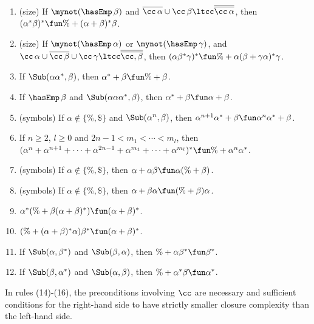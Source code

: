 \begin{enumerate}[\quad(1)]
\item (size) If $\mynot(\hasEmp\,\beta)$ and $\overline{\cc\,\alpha} \cup
  \cc\,\beta \ltcc \overline{\overline{\cc\,\alpha}}$, then
  $(\alpha^*\beta)^* \fun \% + (\alpha+\beta)^*\beta$.

\item (size) If $\mynot(\hasEmp\,\alpha)$ or $\mynot(\hasEmp\,\gamma)$, and
  $\cc\,\alpha \cup \overline{\cc\,\beta} \cup \cc\,\gamma \ltcc
  \overline{\overline{\cc,\beta}}$, then $(\alpha\beta^*\gamma)^*
  \fun \% + \alpha(\beta + \gamma\alpha)^*\gamma$.

\item If $\Sub(\alpha\alpha^*,\beta)$, then $\alpha^*+\beta \fun \% +
  \beta$.

\item If $\hasEmp\,\beta$ and $\Sub(\alpha\alpha\alpha^*, \beta)$,
  then $\alpha^* + \beta \fun \alpha + \beta$.

\item (symbols) If $\alpha\not\in\{\%,\$\}$ and $\Sub(\alpha^n, \beta)$, then
  $\alpha^{n+1}\alpha^* + \beta \fun \alpha^n\alpha^* + \beta$.

\item If $n\geq 2$, $l\geq 0$ and $2n - 1 < m_1 < \cdots < m_l$, then
  $(\alpha^n + \alpha^{n+1} + \cdots + \alpha^{2n - 1} + \alpha^{m_1}
  + \cdots + \alpha^{m_l})^* \fun \% + \alpha^n\alpha^*$.

\item (symbols) If $\alpha\not\in\{\%,\$\}$, then $\alpha+\alpha\beta
  \fun \alpha(\%+\beta)$.

\item (symbols) If $\alpha\not\in\{\%,\$\}$, then $\alpha+\beta\alpha
  \fun (\%+\beta)\alpha$.

\item $\alpha^*(\% + \beta(\alpha+\beta)^*) \fun (\alpha+\beta)^*$.

\item $(\% + (\alpha+\beta)^*\alpha)\beta^* \fun (\alpha+\beta)^*$.

\item If $\Sub(\alpha, \beta^*)$ and $\Sub(\beta, \alpha)$, then
   $\% + \alpha\beta^* \fun \beta^*$.

\item If $\Sub(\beta, \alpha^*)$ and $\Sub(\alpha, \beta)$, then
   $\% + \alpha^* \beta \fun \alpha^*$.
\end{enumerate}

In rules (14)-(16), the preconditions involving $\cc$ are necessary
and sufficient conditions for the right-hand side to have strictly
smaller closure complexity than the left-hand side.

